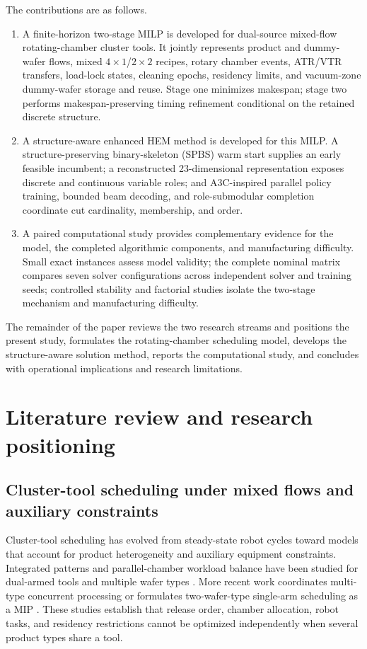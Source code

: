 \documentclass[preprint,12pt,authoryear]{elsarticle}
\begin{document}
The contributions are as follows.

\begin{enumerate}[leftmargin=*]
  \item A finite-horizon two-stage MILP is developed for dual-source
  mixed-flow rotating-chamber cluster tools. It jointly represents product and dummy-wafer flows,
  mixed $4\times1$/$2\times2$ recipes, rotary chamber events, ATR/VTR
  transfers, load-lock states, cleaning epochs, residency limits, and
  vacuum-zone dummy-wafer storage and reuse. Stage one minimizes makespan; stage two performs
  makespan-preserving timing refinement conditional on the retained discrete
  structure.
  \item A structure-aware enhanced HEM method is developed for this MILP.
  A structure-preserving binary-skeleton (SPBS) warm start supplies an early
  feasible incumbent; a reconstructed 23-dimensional representation exposes
  discrete and continuous variable roles; and A3C-inspired parallel policy
  training, bounded beam decoding, and role-submodular completion coordinate
  cut cardinality, membership, and order.
  \item A paired computational study provides complementary evidence for the
  model, the completed algorithmic components, and manufacturing difficulty.
  Small exact instances assess model validity;
  the complete nominal matrix compares seven solver configurations across
  independent solver and training seeds; controlled stability and factorial
  studies isolate the two-stage mechanism and manufacturing difficulty.
\end{enumerate}

The remainder of the paper reviews the two research streams and positions the
present study, formulates the rotating-chamber scheduling model, develops the
structure-aware solution method, reports the computational study, and
concludes with operational implications and research limitations.

\section{Literature review and research positioning}
\label{sec:literature}

\subsection{Cluster-tool scheduling under mixed flows and auxiliary constraints}

Cluster-tool scheduling has evolved from steady-state robot cycles toward
models that account for product heterogeneity and auxiliary equipment
constraints. Integrated patterns and parallel-chamber workload balance have
been studied for dual-armed tools and multiple wafer types
\citep{kim2021integrated,ko2021wafer,zhu2022twotypes}. More recent work
coordinates multi-type concurrent processing or formulates two-wafer-type
single-arm scheduling as a MIP
\citep{li2025cyclicmultitype,yang2025miptwowafers}. These studies establish
that release order, chamber allocation, robot tasks, and residency restrictions
cannot be optimized independently when several product types share a tool.
\end{document}

